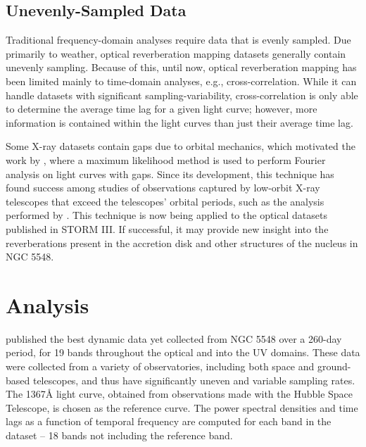 \documentclass[11pt,letterpaper]{article}
\begin{document}
\begin{figure}
\begin{minipage}{.475\textwidth}
            \label{fig:th_freq}
        \end{minipage}
    \end{figure}


	\subsection{Unevenly-Sampled Data}

    Traditional frequency-domain analyses require data that is evenly sampled. Due primarily to weather, optical reverberation mapping datasets generally contain unevenly sampling. Because of this, until now, optical reverberation mapping has been limited mainly to time-domain analyses, e.g., cross-correlation. While it can handle datasets with significant sampling-variability, cross-correlation is only able to determine the average time lag for a given light curve; however, more information is contained within the light curves than just their average time lag.

    Some X-ray datasets contain gaps due to orbital mechanics, which motivated the work by \cite{2013ApJ...777...24Z}, where a maximum likelihood method is used to perform Fourier analysis on light curves with gaps. Since its development, this technique has found success among studies of observations captured by low-orbit X-ray telescopes that exceed the telescopes' orbital periods, such as the analysis performed by \cite{2016Natur.535..388K}. This technique is now being applied to the optical datasets published in STORM III. If successful, it may provide new insight into the reverberations present in the accretion disk and other structures of the nucleus in NGC 5548.

\section{Analysis}
\label{analysis}
\cite{2016ApJ...821...56F} published the best dynamic data yet collected from NGC 5548 over a 260-day period, for 19 bands throughout the optical and into the UV domains. These data were collected from a variety of observatories, including both space and ground-based telescopes, and thus have significantly uneven and variable sampling rates. The 1367\AA$ $ light curve, obtained from observations made with the Hubble Space Telescope, is chosen as the reference curve. The power spectral densities and time lags as a function of temporal frequency are computed for each band in the dataset -- 18 bands not including the reference band.
\end{document}
